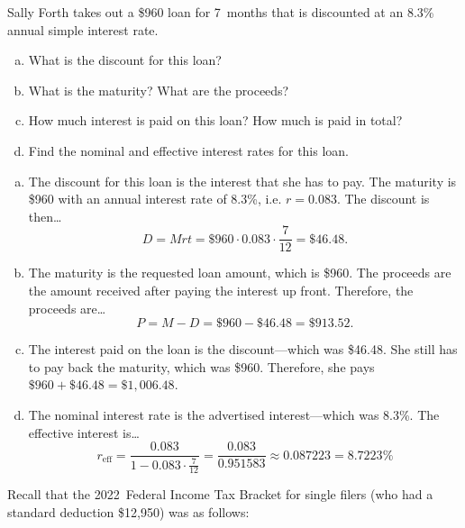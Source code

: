 \documentclass[11pt,letterpaper]{article}
\begin{document}

 Sally Forth takes out a \$960 loan for 7~months that is discounted at an 8.3\% annual simple interest rate.
	\begin{enumerate}[(a)]
	\item What is the discount for this loan?
	\item What is the maturity? What are the proceeds?
	\item How much interest is paid on this loan? How much is paid in total?
	\item Find the nominal and effective interest rates for this loan.
	\end{enumerate} \pspace

\sol
\begin{enumerate}[(a)]
\item The discount for this loan is the interest that she has to pay. The maturity is \$960 with an annual interest rate of 8.3\%, i.e. $r= 0.083$. The discount is then\dots
	\[
	D= Mrt= \$960 \cdot 0.083 \cdot \dfrac{7}{12}= \$46.48.
	\] \pspace

\item The maturity is the requested loan amount, which is \$960. The proceeds are the amount received after paying the interest up front. Therefore, the proceeds are\dots
	\[
	P= M - D= \$960 - \$46.48= \$913.52.
	\] \pspace

\item The interest paid on the loan is the discount---which was \$46.48. She still has to pay back the maturity, which was \$960. Therefore, she pays $\$960 + \$46.48= \$1,006.48$. \pspace

\item The nominal interest rate is the advertised interest---which was 8.3\%. The effective interest is\dots
	\[
	r_{\text{eff}}= \dfrac{0.083}{1 - 0.083 \cdot \frac{7}{12}}= \dfrac{0.083}{0.951583} \approx 0.087223= 8.7223\%
	\]
\end{enumerate}



\newpage



 Recall that the 2022~Federal Income Tax Bracket for single filers (who had a standard deduction \$12,950) was as follows:
	\begin{table}[!ht]
	\centering
	\end{table}
\end{document}
